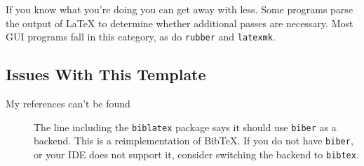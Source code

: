 \documentclass[../{{cookiecutter.project_slug}}.tex]{subfiles}
\begin{document}
    If  you know  what  you're doing  you  can get  away  with less.   Some
    programs parse the  output of \LaTeX{} to  determine whether additional
    passes are necessary.  Most GUI programs fall in this category, as do
    \verb+rubber+ and \verb+latexmk+.

    \subsection{Issues With This Template}
    \begin{description}
        \item [My references can't be found] 
            The line including the \texttt{biblatex} package says it should
            use \texttt{biber} as a backend.  This is a reimplementation of
            BibTeX. If you do not have \texttt{biber}, or your IDE does not
            support it, consider switching the backend to \texttt{bibtex}.
    \end{description}
\end{document}
